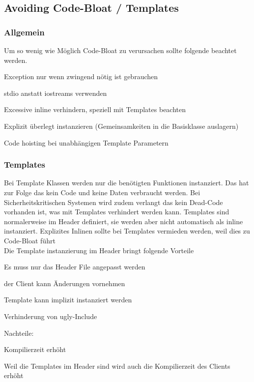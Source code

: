 \subsection{Avoiding Code-Bloat / Templates}
\subsubsection{Allgemein}
Um so wenig wie Möglich Code-Bloat zu verursachen sollte folgende beachtet werden.
\begin{compactitem}
    \item Exception nur wenn zwingend nötig ist gebrauchen
    \item stdio anstatt iostreams verwenden
    \item Excessive inline verhindern, speziell mit Templates beachten
    \item Explizit überlegt instanzieren (Gemeinsamkeiten in die Basisklasse auslagern)
    \item Code hoisting bei unabhängigen Template Parametern
\end{compactitem}

\subsubsection{Templates}
Bei Template Klassen werden nur die benötigten Funktionen instanziert. Das hat zur Folge das kein Code und keine Daten verbraucht werden. Bei Sicherheitskritischen Systemen wird zudem verlangt das kein Dead-Code vorhanden ist, was mit Templates verhindert werden kann. Templates sind normalerweise im Header definiert, sie werden aber nicht automatisch als inline instanziert. Explizites Inlinen sollte bei Templates vermieden werden, weil dies zu Code-Bloat führt\\

Die Template instanzierung im Header bringt folgende Vorteile
\begin{compactitem}
    \item Es muss nur das Header File angepasst werden
    \item der Client kann Änderungen vornehmen
    \item Template kann implizit instanziert werden
    \item Verhinderung von ugly-Include
\end{compactitem}

Nachteile:
\begin{compactitem}
    \item Kompilierzeit erhöht
    \item Weil die Templates im Header sind wird auch die Kompilierzeit des Clients erhöht
\end{compactitem}


